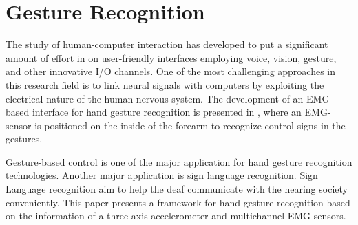 \section{Gesture Recognition}
The study of human-computer interaction has developed to put a significant amount of effort in on user-friendly interfaces employing voice, vision, gesture, and other innovative I/O channels. One of the most challenging approaches in this research field is to link neural signals with computers by exploiting the electrical nature of the human nervous system. The development of an EMG-based interface for hand gesture recognition is presented in \cite{kim2008emg}, where an EMG-sensor is positioned on the inside of the forearm to recognize control signs in the gestures.

Gesture-based control is one of the major application for hand gesture recognition technologies. Another major application is sign language recognition. Sign Language recognition aim to help the deaf communicate with the hearing society conveniently. This paper \cite{zhang2011framework} presents a framework for hand gesture recognition based on the information of a three-axis accelerometer and multichannel EMG sensors.
